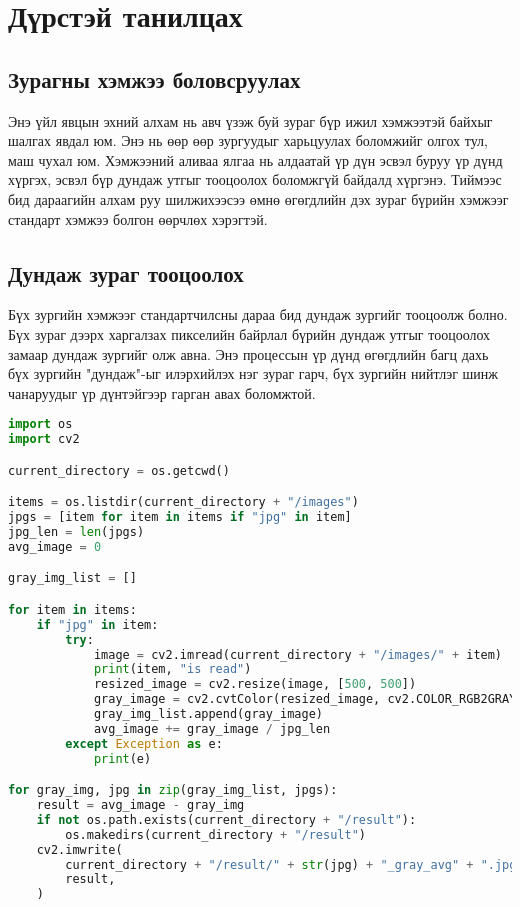 \chapter{Дүрстэй танилцах}
\section{Зурагны хэмжээ боловсруулах}
Энэ үйл явцын эхний алхам нь авч үзэж буй зураг бүр ижил хэмжээтэй байхыг шалгах явдал юм. Энэ нь өөр өөр зургуудыг харьцуулах боломжийг олгох тул, маш чухал юм. Хэмжээний аливаа ялгаа нь алдаатай үр дүн эсвэл буруу үр дүнд хүргэх, эсвэл бүр дундаж утгыг тооцоолох боломжгүй байдалд хүргэнэ. Тиймээс бид дараагийн алхам руу шилжихээсээ өмнө өгөгдлийн  дэх зураг бүрийн хэмжээг стандарт хэмжээ болгон өөрчлөх хэрэгтэй.

\section{Дундаж зураг тооцоолох}
Бүх зургийн хэмжээг стандартчилсны дараа бид дундаж зургийг тооцоолж болно. Бүх зураг дээрх харгалзах пикселийн байрлал бүрийн дундаж утгыг тооцоолох замаар дундаж зургийг олж авна. Энэ процессын үр дүнд өгөгдлийн багц дахь бүх зургийн "дундаж"-ыг илэрхийлэх нэг зураг гарч, бүх зургийн нийтлэг шинж чанаруудыг үр дүнтэйгээр гарган авах боломжтой.

\begin{lstlisting}[language=Python, caption=Дундаж зураг тооцоолох код, frame=single]
import os
import cv2

current_directory = os.getcwd()

items = os.listdir(current_directory + "/images")
jpgs = [item for item in items if "jpg" in item]
jpg_len = len(jpgs)
avg_image = 0

gray_img_list = []

for item in items:
    if "jpg" in item:
        try:
            image = cv2.imread(current_directory + "/images/" + item)
            print(item, "is read")
            resized_image = cv2.resize(image, [500, 500])
            gray_image = cv2.cvtColor(resized_image, cv2.COLOR_RGB2GRAY)
            gray_img_list.append(gray_image)
            avg_image += gray_image / jpg_len
        except Exception as e:
            print(e)

for gray_img, jpg in zip(gray_img_list, jpgs):
    result = avg_image - gray_img
    if not os.path.exists(current_directory + "/result"):
        os.makedirs(current_directory + "/result")
    cv2.imwrite(
        current_directory + "/result/" + str(jpg) + "_gray_avg" + ".jpg",
        result,
    )
	\end{lstlisting}
	
